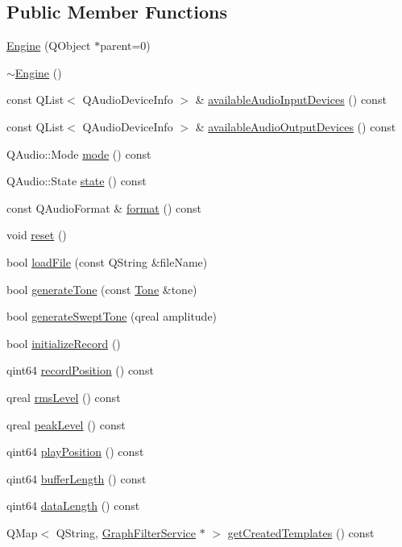\subsection*{Public Member Functions}
\begin{DoxyCompactItemize}
\item 
\hyperlink{class_engine_aa9a980fee0abf2524c4c449c0894c383}{Engine} (Q\+Object $\ast$parent=0)
\item 
\hyperlink{class_engine_a8ef7030a089ecb30bbfcb9e43094717a}{$\sim$\+Engine} ()
\item 
const Q\+List$<$ Q\+Audio\+Device\+Info $>$ \& \hyperlink{class_engine_a6e06ecaa303e1b03581ce9ea296740e8}{available\+Audio\+Input\+Devices} () const
\item 
const Q\+List$<$ Q\+Audio\+Device\+Info $>$ \& \hyperlink{class_engine_a6b4c101c20dcd1843832049c379c334b}{available\+Audio\+Output\+Devices} () const
\item 
Q\+Audio\+::\+Mode \hyperlink{class_engine_a63bb47972a1e0692432dd704a60e49bc}{mode} () const
\item 
Q\+Audio\+::\+State \hyperlink{class_engine_af21cf755f29c026ce0bc54f392d74adc}{state} () const
\item 
const Q\+Audio\+Format \& \hyperlink{class_engine_a275e6b498d8d956e10bdeeef9c494673}{format} () const
\item 
void \hyperlink{class_engine_ac3b86066213c3e8a1b5186426c12bb50}{reset} ()
\item 
bool \hyperlink{class_engine_aad11dc39fb12f9ab53f9c2ec29a02aa5}{load\+File} (const Q\+String \&file\+Name)
\item 
bool \hyperlink{class_engine_aaaa5e9ce9bf266dac28460e2adaa1270}{generate\+Tone} (const \hyperlink{struct_tone}{Tone} \&tone)
\item 
bool \hyperlink{class_engine_a0fa43cb25d35f9da09b58612a8af9e77}{generate\+Swept\+Tone} (qreal amplitude)
\item 
bool \hyperlink{class_engine_a00ceb1aec88fc531e5c4decfac40b8a4}{initialize\+Record} ()
\item 
qint64 \hyperlink{class_engine_a6d176811eefe7ae0979481862670003a}{record\+Position} () const
\item 
qreal \hyperlink{class_engine_a0a7764981d74fab25e390fa6f91aeb03}{rms\+Level} () const
\item 
qreal \hyperlink{class_engine_aab1cbc9a117974fe64cb0875a02792ab}{peak\+Level} () const
\item 
qint64 \hyperlink{class_engine_a2b295fe42d3e6e4f04f56c3f63ebe945}{play\+Position} () const
\item 
qint64 \hyperlink{class_engine_a1e21c3b6d92bfa97d8ad77ce67f28264}{buffer\+Length} () const
\item 
qint64 \hyperlink{class_engine_a046bdd2d3c60411e1c08253bb1af28df}{data\+Length} () const
\item 
Q\+Map$<$ Q\+String, \hyperlink{class_graph_filter_service}{Graph\+Filter\+Service} $\ast$ $>$ \hyperlink{class_engine_a252738800567e88de862458d94bcad15}{get\+Created\+Templates} () const
\end{DoxyCompactItemize}

